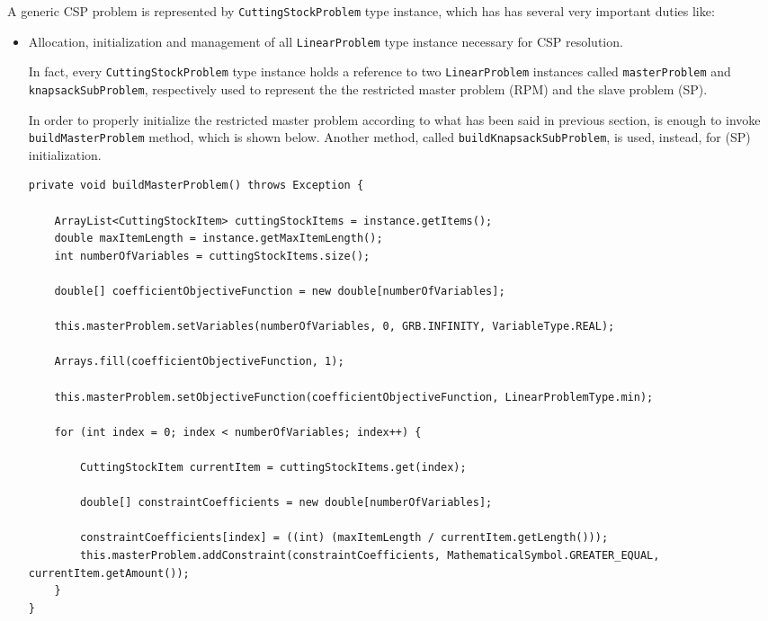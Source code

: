 \documentclass[10pt,a4paper]{article}
\begin{document}
A generic CSP problem is represented by \texttt{CuttingStockProblem} type instance, which has has several very important duties like:

\begin{itemize}

\item Allocation, initialization and management of all \texttt{LinearProblem} type instance necessary for CSP resolution.

In fact, every \texttt{CuttingStockProblem} type instance holds a reference to two \texttt{LinearProblem} instances called \texttt{masterProblem} and \texttt{knapsackSubProblem}, respectively used to represent the the restricted master problem (RPM) and the slave problem (SP).

In order to properly initialize the restricted master problem according to what has been said in previous section, is enough to invoke \texttt{buildMasterProblem} method, which is shown below. Another method, called \texttt{buildKnapsackSubProblem}, is used, instead, for (SP) initialization.

\begin{adjustwidth}{-2cm}{-2cm}
\begin{lstlisting}[frame=lines, caption={\texttt{buildMasterProblem()} method implementation.}, label={code:cga}]
private void buildMasterProblem() throws Exception {

    ArrayList<CuttingStockItem> cuttingStockItems = instance.getItems();
    double maxItemLength = instance.getMaxItemLength();
    int numberOfVariables = cuttingStockItems.size();

    double[] coefficientObjectiveFunction = new double[numberOfVariables];

    this.masterProblem.setVariables(numberOfVariables, 0, GRB.INFINITY, VariableType.REAL);

    Arrays.fill(coefficientObjectiveFunction, 1);

    this.masterProblem.setObjectiveFunction(coefficientObjectiveFunction, LinearProblemType.min);

    for (int index = 0; index < numberOfVariables; index++) {

        CuttingStockItem currentItem = cuttingStockItems.get(index);

        double[] constraintCoefficients = new double[numberOfVariables];

        constraintCoefficients[index] = ((int) (maxItemLength / currentItem.getLength()));
        this.masterProblem.addConstraint(constraintCoefficients, MathematicalSymbol.GREATER_EQUAL, currentItem.getAmount());
    }
}
\end{lstlisting}
\end{adjustwidth} 


\end{itemize}
\end{document}
